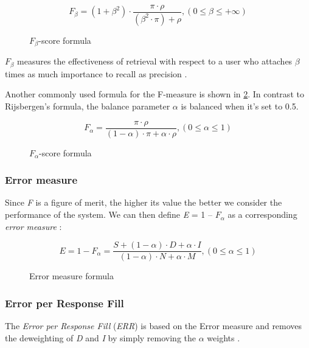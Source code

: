 \begin{figure}[H]
\begin{displaymath}
	F_\beta = (1+\beta^2) \cdot \frac{\pi \cdot \rho}{(\beta^2 \cdot \pi) + \rho}, (0 \le \beta \le +\infty)
\end{displaymath}
\caption{$\textit{F}_\beta$-score formula \cite{Chinchor:1992}}
\label{fig:fbeta-score}
\end{figure}

$\textit{F}_\beta$ measures the effectiveness of retrieval with respect to a user who attaches $\beta$ times as much importance to recall as precision \cite{Rijsbergen:1979}.

Another commonly used formula for the F-measure is shown in \ref{fig:falpha-score}. In contrast to Rijsbergen's formula, the balance parameter $\alpha$ is balanced when it's set to 0.5.

\begin{figure}[H]
\begin{displaymath}
	F_\alpha = \frac{\pi \cdot \rho}{(1-\alpha) \cdot \pi + \alpha \cdot \rho}, (0 \le \alpha \le 1)
\end{displaymath}
\caption{$\textit{F}_\alpha$-score formula \cite{Makhoul:1999}}
\label{fig:falpha-score}
\end{figure}

\subsubsection{Error measure}
Since \textit{F} is a figure of merit, the higher its value the better we consider the performance of the system. We can then define \textit{E} = 1 – $F_\alpha$ as a corresponding \textit{error measure} \cite{Makhoul:1999}:

\begin{figure}[H]
\begin{displaymath}
	E = 1 - F_\alpha = \frac{S + (1-\alpha) \cdot D + \alpha \cdot I}{(1-\alpha) \cdot N + \alpha \cdot M}, (0 \le \alpha \le 1)
\end{displaymath}
\caption{Error measure formula}
\label{eq:error-measure}
\end{figure}

\subsubsection{Error per Response Fill}
The \textit{Error per Response Fill} (\textit{ERR}) is based on the Error measure and removes the deweighting of \textit{D} and \textit{I} by simply removing the $\alpha$ weights \cite{Chinchor:1995}\cite{Makhoul:1999}.

